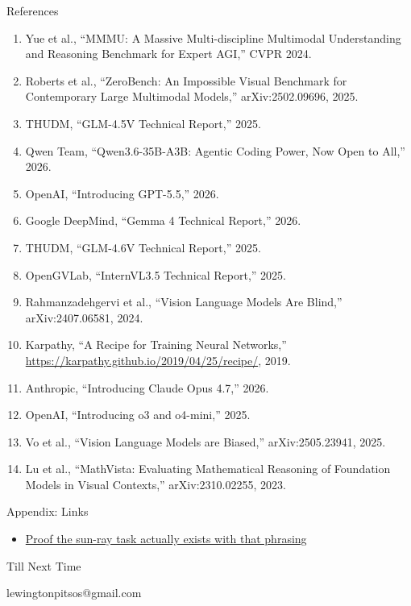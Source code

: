 \documentclass[aspectratio=169]{beamer}
\begin{document}
\begin{frame}{References}
\footnotesize
\begin{enumerate}
\item Yue et al., ``MMMU: A Massive Multi-discipline Multimodal Understanding and Reasoning Benchmark for Expert AGI,'' CVPR 2024.
\item Roberts et al., ``ZeroBench: An Impossible Visual Benchmark for Contemporary Large Multimodal Models,'' arXiv:2502.09696, 2025.
\item THUDM, ``GLM-4.5V Technical Report,'' 2025.
\item Qwen Team, ``Qwen3.6-35B-A3B: Agentic Coding Power, Now Open to All,'' 2026.
\item OpenAI, ``Introducing GPT-5.5,'' 2026.
\item Google DeepMind, ``Gemma 4 Technical Report,'' 2026.
\item THUDM, ``GLM-4.6V Technical Report,'' 2025.
\item OpenGVLab, ``InternVL3.5 Technical Report,'' 2025.
\item Rahmanzadehgervi et al., ``Vision Language Models Are Blind,'' arXiv:2407.06581, 2024.
\item Karpathy, ``A Recipe for Training Neural Networks,'' \url{https://karpathy.github.io/2019/04/25/recipe/}, 2019.
\item Anthropic, ``Introducing Claude Opus 4.7,'' 2026.
\item OpenAI, ``Introducing o3 and o4-mini,'' 2025.
\item Vo et al., ``Vision Language Models are Biased,'' arXiv:2505.23941, 2025.
\item Lu et al., ``MathVista: Evaluating Mathematical Reasoning of Foundation Models in Visual Contexts,'' arXiv:2310.02255, 2023.
\end{enumerate}
\end{frame}

\begin{frame}{Appendix: Links}
\begin{itemize}
\item \href{https://datasets-server.huggingface.co/rows?dataset=MMMU\%2FMMMU\_Pro&config=standard+\%2810+options\%29&split=test&offset=476&length=1}{Proof the sun-ray task actually exists with that phrasing}
\end{itemize}
\end{frame}

\begin{frame}
\centering
\vfill
{\Huge Till Next Time}

\vspace{1.5em}

\vspace{1em}
{\normalsize lewingtonpitsos@gmail.com}
\vfill
\end{frame}
\end{document}
